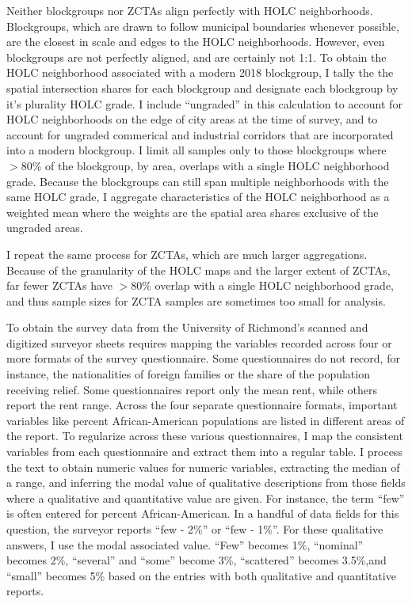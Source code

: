 \documentclass[
]{article}
\begin{document}
Neither blockgroups nor ZCTAs align perfectly with HOLC neighborhoods. Blockgroups, which are drawn to follow municipal boundaries whenever possible, are the closest in scale and edges to the HOLC neighborhoods. However, even blockgroups are not perfectly aligned, and are certainly not 1:1. To obtain the HOLC neighborhood associated with a modern 2018 blockgroup, I tally the the spatial intersection shares for each blockgroup and designate each blockgroup by it's plurality HOLC grade. I include ``ungraded'' in this calculation to account for HOLC neighborhoods on the edge of city areas at the time of survey, and to account for ungraded commerical and industrial corridors that are incorporated into a modern blockgroup. I limit all samples only to those blockgroups where \(>80\%\) of the blockgroup, by area, overlaps with a single HOLC neighborhood grade. Because the blockgroups can still span multiple neighborhoods with the same HOLC grade, I aggregate characteristics of the HOLC neighborhood as a weighted mean where the weights are the spatial area shares exclusive of the ungraded areas.

I repeat the same process for ZCTAs, which are much larger aggregations. Because of the granularity of the HOLC maps and the larger extent of ZCTAs, far fewer ZCTAs have \(>80\%\) overlap with a single HOLC neighborhood grade, and thus sample sizes for ZCTA samples are sometimes too small for analysis.

To obtain the survey data from the University of Richmond's scanned and digitized surveyor sheets requires mapping the variables recorded across four or more formats of the survey questionnaire. Some questionnaires do not record, for instance, the nationalities of foreign families or the share of the population receiving relief. Some questionnaires report only the mean rent, while others report the rent range. Across the four separate questionnaire formats, important variables like percent African-American populations are listed in different areas of the report. To regularize across these various questionnaires, I map the consistent variables from each questionnaire and extract them into a regular table. I process the text to obtain numeric values for numeric variables, extracting the median of a range, and inferring the modal value of qualitative descriptions from those fields where a qualitative and quantitative value are given. For instance, the term ``few'' is often entered for percent African-American. In a handful of data fields for this question, the surveyor reports ``few - 2\%'' or ``few - 1\%''. For these qualitative answers, I use the modal associated value. ``Few'' becomes 1\%, ``nominal'' becomes 2\%, ``several'' and ``some'' become 3\%, ``scattered'' becomes 3.5\%,and ``small'' becomes 5\% based on the entries with both qualitative and quantitative reports.
\end{document}
